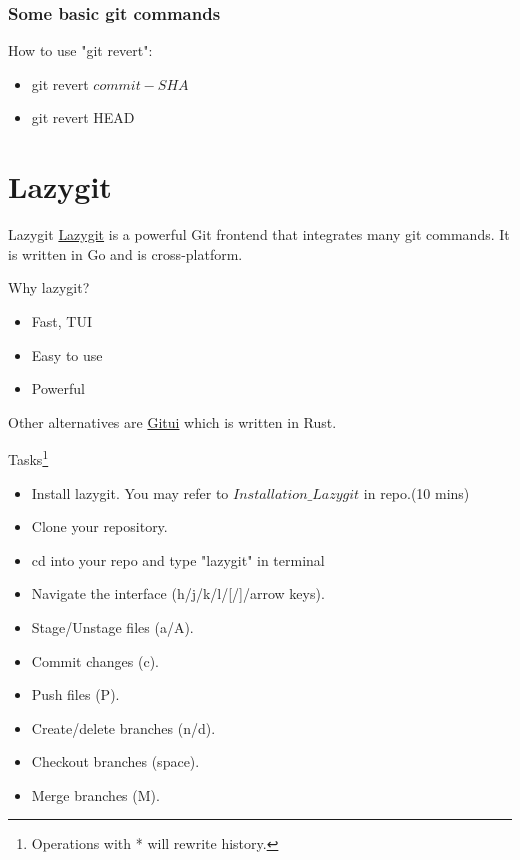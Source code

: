 \documentclass[aspectratio=169]{beamer}
\begin{document}
\begin{frame}
  \frametitle{Some basic git commands}
  How to use "git revert":
  \begin{itemize}
    \item git revert $commit-SHA$
    \item git revert HEAD
  \end{itemize}
\end{frame}

\section{Lazygit}
\begin{frame}{Lazygit}
  \href{https://github.com/jesseduffield/lazygit}{Lazygit} is a powerful Git frontend that integrates many git commands. It is written in Go and is cross-platform.

  \pause

  Why lazygit?
  \begin{itemize}
      \item Fast, TUI
      \item Easy to use
      \item Powerful
  \end{itemize}

  Other alternatives are \href{https://github.com/Extrawurst/gitui}{Gitui} which is written in Rust.
\end{frame}

\begin{frame}{Tasks\footnote{Operations with * will rewrite history.}}
          \begin{itemize}[<+->]
              \item Install lazygit. You may refer to $Installation\_Lazygit$ in repo.(10 mins)
              \item Clone your repository.
              \item cd into your repo and type "lazygit" in terminal
              \item Navigate the interface (h/j/k/l/[/]/arrow keys).
              \item Stage/Unstage files (a/A).
              \item Commit changes (c).
              \item Push files (P).
              \item Create/delete branches (n/d).
              \item Checkout branches (space).
              \item Merge branches (M).
          \end{itemize}
\end{frame}
\end{document}
